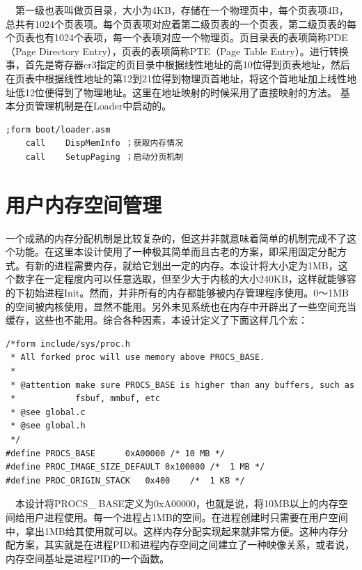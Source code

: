 \documentclass[UTF8,nofonts,cs4size]{ctexrep}
\begin{document}
\indent \ \ 
第一级也表叫做页目录，大小为4KB，存储在一个物理页中，每个页表项4B，总共有1024个页表项。每个页表项对应着第二级页表的一个页表，第二级页表的每个页表也有1024个表项，每一个表项对应一个物理页。页目录表的表项简称PDE（Page Directory Entry），页表的表项简称PTE（Page Table Entry）。进行转换事，首先是寄存器cr3指定的页目录中根据线性地址的高10位得到页表地址，然后在页表中根据线性地址的第12到21位得到物理页首地址，将这个首地址加上线性地址低12位便得到了物理地址。这里在地址映射的时候采用了直接映射的方法。
基本分页管理机制是在Loader中启动的。
\begin{lstlisting}
;form boot/loader.asm
	call	DispMemInfo ；获取内存情况
	call	SetupPaging ；启动分页机制
\end{lstlisting}
\section{用户内存空间管理}
一个成熟的内存分配机制是比较复杂的，但这并非就意味着简单的机制完成不了这个功能。在这里本设计使用了一种极其简单而且古老的方案，即采用固定分配方式。有新的进程需要内存，就给它划出一定的内存。本设计将大小定为1MB，这个数字在一定程度内可以任意选取，但至少大于内核的大小240KB，这样就能够容的下初始进程Init。然而，并非所有的内存都能够被内存管理程序使用。0～1MB的空间被内核使用，显然不能用。另外未见系统也在内存中开辟出了一些空间充当缓存，这些也不能用。综合各种因素，本设计定义了下面这样几个宏：
\begin{lstlisting}
/*form include/sys/proc.h
 * All forked proc will use memory above PROCS_BASE.
 *
 * @attention make sure PROCS_BASE is higher than any buffers, such as
 *            fsbuf, mmbuf, etc
 * @see global.c
 * @see global.h
 */
#define	PROCS_BASE		0xA00000 /* 10 MB */
#define	PROC_IMAGE_SIZE_DEFAULT	0x100000 /*  1 MB */
#define	PROC_ORIGIN_STACK	0x400    /*  1 KB */
\end{lstlisting}
\indent \ \ 
本设计将PROCS\_ BASE定义为0xA00000，也就是说，将10MB以上的内存空间给用户进程使用。每一个进程占1MB的空间。在进程创建时只需要在用户空间中，拿出1MB给其使用就可以。这样内存分配实现起来就非常方便。这种内存分配方案，其实就是在进程PID和进程内存空间之间建立了一种映像关系，或者说，内存空间基址是进程PID的一个函数。
\end{document}
